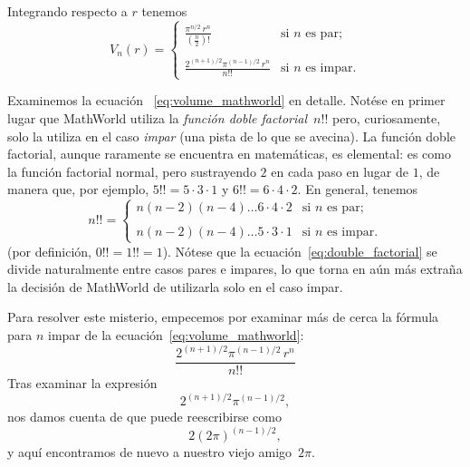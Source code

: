 Integrando respecto a $r$ tenemos
\begin{equation}
\label{eq:volume_mathworld}
V_n(r) = \begin{cases}
\displaystyle \frac{\pi^{n/2}\,r^n}{(\frac{n}{2})!} & \text{si } n \text{ es par}; \\ \\
\displaystyle \frac{2^{(n+1)/2}\pi^{(n-1)/2}\,r^n}{n!!} & \text{si } n \text{ es impar}.
\end{cases}
\end{equation}

Examinemos la ecuación ~\eqref{eq:volume_mathworld} en detalle. Notése en primer lugar que MathWorld utiliza la \emph{función doble factorial}~$n!!$ pero, curiosamente, solo la utiliza en el caso \emph{impar} (una pista de lo que se avecina). La función doble factorial, aunque raramente se encuentra en matemáticas, es elemental: es como la función factorial normal, pero sustrayendo $2$ en cada paso en lugar de $1$, de manera que, por ejemplo, $5!! = 5 \cdot 3 \cdot 1$ y $6!! = 6 \cdot 4 \cdot 2$. En general, tenemos
\begin{equation}
\label{eq:double_factorial}
n!! = \begin{cases}
n(n-2)(n-4)\ldots6\cdot4\cdot2 & \text{si } n \text{ es par}; \\ \\
n(n-2)(n-4)\ldots5\cdot3\cdot1 & \text{si } n \text{ es impar}.
\end{cases}
\end{equation}
(por definición, $0!! = 1!! = 1$). Nótese que la ecuación~\eqref{eq:double_factorial} se divide naturalmente entre casos pares e impares, lo que torna en aún más extraña la decisión de MathWorld de utilizarla solo en el caso impar.

Para resolver este misterio, empecemos por examinar más de cerca la fórmula para $n$ impar de la ecuación~\eqref{eq:volume_mathworld}:
\[ \frac{2^{(n+1)/2}\pi^{(n-1)/2}\,r^n}{n!!} \]
Tras examinar la expresión
\[ 2^{(n+1)/2}\pi^{(n-1)/2}, \]
nos damos cuenta de que puede reescribirse como
\[ 2(2\pi)^{(n-1)/2}, \]
y aquí encontramos de nuevo a nuestro viejo amigo~$2\pi$.

